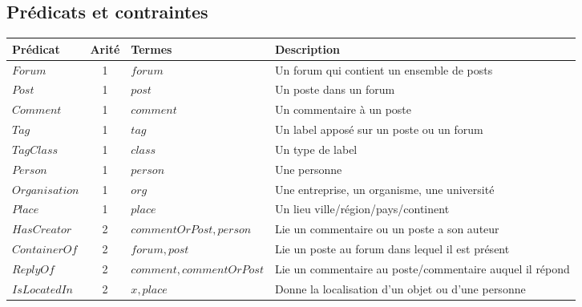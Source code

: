 \subsection{Prédicats et contraintes}

\begin{table}[H]
    \centering
    \begin{adjustbox}{max width=\linewidth}
        \begin{tabular}{l|c|l|l}
            Prédicat       & Arité & Termes                   & Description                                              \\
            \hline
            \hline
            $Forum$        & 1     & $forum$                  & Un forum qui contient un ensemble de posts               \\
            $Post$         & 1     & $post$                   & Un poste dans un forum                                   \\
            $Comment$      & 1     & $comment$                & Un commentaire à un poste                                \\
            $Tag$          & 1     & $tag$                    & Un label apposé sur un poste ou un forum                 \\
            $TagClass$     & 1     & $class$                  & Un type de label                                         \\
            $Person$       & 1     & $person$                 & Une personne                                             \\
            $Organisation$ & 1     & $org$                    & Une entreprise, un organisme, une université             \\
            $Place$        & 1     & $place$                  & Un lieu ville/région/pays/continent                      \\
            $HasCreator$   & 2     & $commentOrPost, person$  & Lie un commentaire ou un poste a son auteur              \\
            $ContainerOf$  & 2     & $forum, post$            & Lie un poste au forum dans lequel il est présent         \\
            $ReplyOf$      & 2     & $comment, commentOrPost$ & Lie un commentaire au poste/commentaire auquel il répond \\
            $IsLocatedIn$  & 2     & $x, place$               & Donne la localisation d'un objet ou d'une personne       \\

\end{tabular}
\end{adjustbox}
\end{table}
